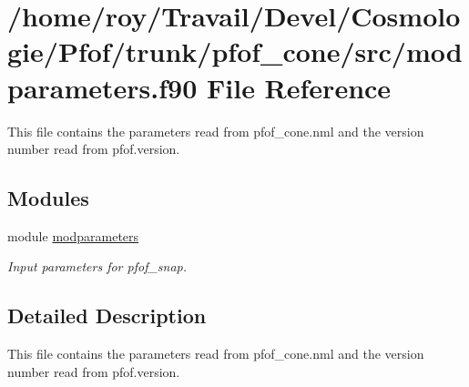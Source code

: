 \hypertarget{pfof__cone_2src_2modparameters_8f90}{}\section{/home/roy/\+Travail/\+Devel/\+Cosmologie/\+Pfof/trunk/pfof\+\_\+cone/src/modparameters.f90 File Reference}
\label{pfof__cone_2src_2modparameters_8f90}


This file contains the parameters read from pfof\+\_\+cone.\+nml and the version number read from pfof.\+version.  


\subsection*{Modules}
\begin{DoxyCompactItemize}
\item 
module \hyperlink{namespacemodparameters}{modparameters}
\begin{DoxyCompactList}\small\item\em Input parameters for pfof\+\_\+snap. ~\newline
 \end{DoxyCompactList}\end{DoxyCompactItemize}


\subsection{Detailed Description}
This file contains the parameters read from pfof\+\_\+cone.\+nml and the version number read from pfof.\+version. 

